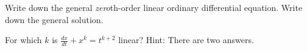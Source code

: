 \begin{exercise}
Write down the general \emph{zero}th-order linear ordinary differential
equation.  Write down the general solution.
\end{exercise}

\begin{exercise}
For which $k$ is $\frac{dx}{dt}+x^k = t^{k+2}$ linear?  Hint: There are two answers.
\end{exercise}

